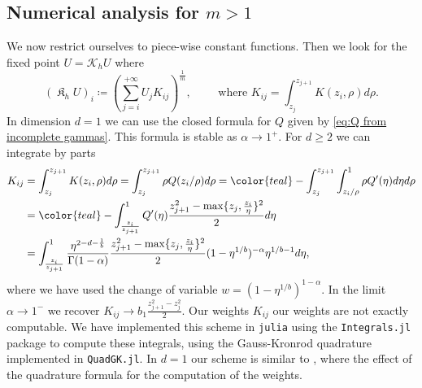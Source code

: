 \documentclass[a4paper]{article}
\theoremstyle{definition}
\DeclareMathOperator{\fixedpoint}{\mathfrak K}
\begin{document}
%

\subsection{Numerical analysis for $m > 1$}

We now restrict ourselves to piece-wise constant functions. Then we look for the fixed point $U = \mathcal K_h U$ where
\begin{equation}
(\fixedpoint_h U)_i \coloneqq  \left( \sum_{j=i}^{+\infty} U_j K_{ij} \right)^{\frac 1 m}, \qquad \text{ where }
K_{ij} = \int_{z_{j}}^{z_{j+1}} K(z_i, \rho) d\rho.
\end{equation}
In dimension $d = 1$ we can use the closed formula for $Q$ given by \eqref{eq:Q from incomplete gammas}. This formula is stable as $\alpha \to 1^+$. For $d \ge 2$ we can integrate by parts
\begin{equation}
\begin{aligned}
  K_{ij} & = \int_{z_j}^{z_{j+1}} K(z_i, \rho) d\rho = \int_{z_j}^{z_{j+1}} \rho Q(z_i/\rho) d\rho = \color{teal}-\normalcolor\int_{z_j}^{z_{j+1}}  \int_{z_i/\rho}^1 \rho Q'(\eta)  d \eta d \rho
  \\
  & = \color{teal}-\normalcolor\int_{\frac{z_i}{z_{j+1}}}^{1} Q'(\eta) \frac{z_{j+1}^2 - \max\{ z_j, \frac{z_i}{\eta} \}^2} 2 d \eta
  \\
  & = \int_{\frac{z_i}{z_{j+1}}}^{1} \frac{\eta^{2-d-\frac{1}{b}}}{\Gamma(1-\alpha)} \frac{z_{j+1}^2 - \max\{ z_j, \frac{z_i}{\eta} \}^2} 2 (1-\eta^{1/b})^{-\alpha} \eta ^{1/b-1} d \eta,
\end{aligned}
\end{equation}
where we have used the change of variable $w = (1 - \eta^{1/b})^{1-\alpha}$. In the limit $\alpha \to 1^-$ we recover $K_{ij} \to b_1 \frac{z_{j+1}^2 - z_j^2}{2}$.
%
%
%
%
Our weights $K_{ij}$ our weights are not exactly computable. We have implemented this scheme in \texttt{julia} using the \texttt{Integrals.jl} package to compute these integrals, using the Gauss-Kronrod quadrature implemented in \texttt{QuadGK.jl}.
In $d=1$ our scheme is similar to \cite{Plociniczak2019}, where the effect of the quadrature formula for the computation of the weights.

\bigskip
\end{document}

